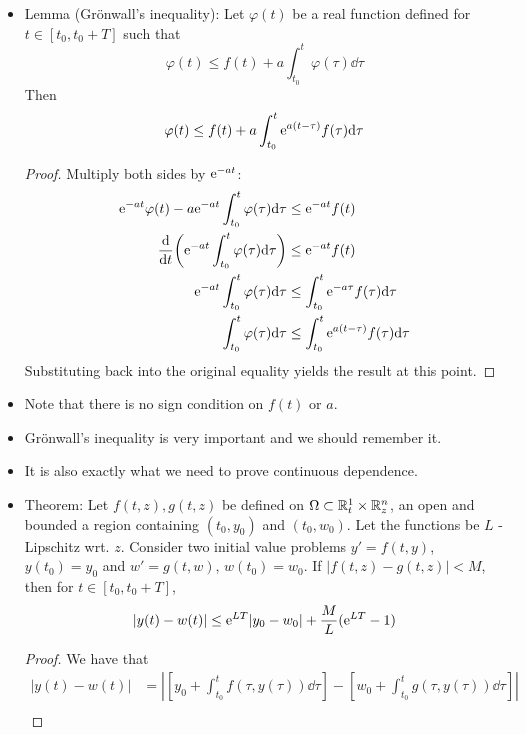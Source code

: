 \documentclass[../notes.tex]{subfiles}
\begin{document}
\begin{itemize}
\begin{enumerate}
    \end{enumerate}
    \item Lemma (Gr\"{o}nwall's inequality): Let $\varphi(t)$ be a real function defined for $t\in[t_0,t_0+T]$ such that
    \begin{equation*}
        \varphi(t) \leq f(t)+a\int_{t_0}^t\varphi(\tau)\dd\tau
    \end{equation*}
    Then
    \begin{equation*}
        \varphi(t) \leq f(t)+a\int_{t_0}^t\e[a(t-\tau)]f(\tau)\dd\tau
    \end{equation*}
    \begin{proof}
        Multiply both sides by $\e[-at]$:
        \begin{align*}
            \e[-at]\varphi(t)-a\e[-at]\int_{t_0}^t\varphi(\tau)\dd\tau &\leq \e[-at]f(t)\\
            \dv{t}(\e[-at]\int_{t_0}^t\varphi(\tau)\dd\tau) &\leq \e[-at]f(t)\\
            \e[-at]\int_{t_0}^t\varphi(\tau)\dd\tau &\leq \int_{t_0}^t\e[-a\tau]f(\tau)\dd\tau\\
            \int_{t_0}^t\varphi(\tau)\dd\tau &\leq \int_{t_0}^t\e[a(t-\tau)]f(\tau)\dd\tau
        \end{align*}
        Substituting back into the original equality yields the result at this point.
    \end{proof}
    \item Note that there is no sign condition on $f(t)$ or $a$.
    \item Gr\"{o}nwall's inequality is very important and we should remember it.
    \item It is also exactly what we need to prove continuous dependence.
    \item Theorem: Let $f(t,z),g(t,z)$ be defined on $\Omega\subset\R_t^1\times\R_z^n$, an open and bounded a region containing $(t_0,y_0)$ and $(t_0,w_0)$. Let the functions be $L$ - Lipschitz wrt. $z$. Consider two initial value problems $y'=f(t,y)$, $y(t_0)=y_0$ and $w'=g(t,w)$, $w(t_0)=w_0$. If $|f(t,z)-g(t,z)|<M$, then for $t\in[t_0,t_0+T]$,
    \begin{equation*}
        |y(t)-w(t)| \leq \e[LT]|y_0-w_0|+\frac{M}{L}(\e[LT]-1)
    \end{equation*}
    \begin{proof}
        We have that
        \begin{align*}
            |y(t)-w(t)| &= \left| \left[ y_0+\int_{t_0}^tf(\tau,y(\tau))\dd\tau \right]-\left[ w_0+\int_{t_0}^tg(\tau,y(\tau))\dd\tau \right] \right|\\

\end{align*}
\end{proof}
\end{itemize}
\end{document}
